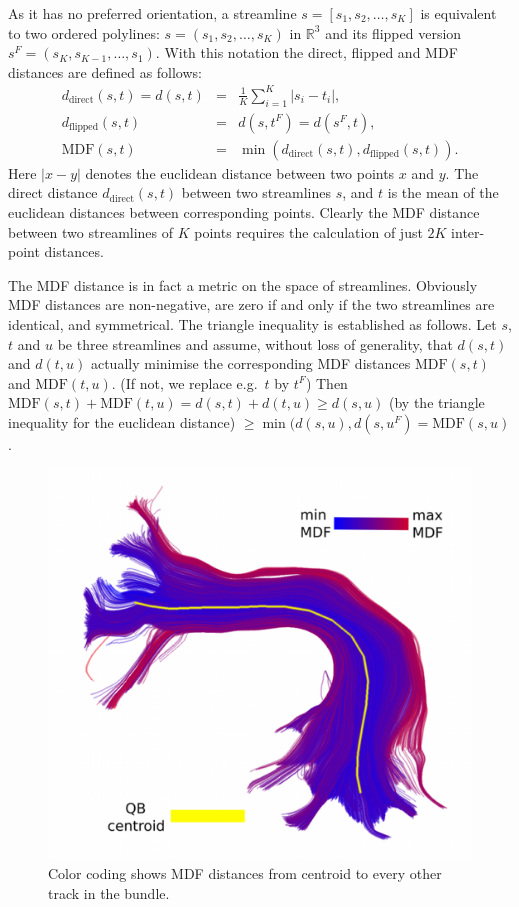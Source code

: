 \documentclass{bioinfo}
\begin{document}
\begin{methods}
As it has no preferred orientation, a streamline $s=[s_1, s_2, \ldots, s_K]$ is equivalent to
two ordered polylines: $s = (s_1, s_2, \ldots, s_K)$ in $\mathbb{R}^3$
and its flipped version $s^F = (s_K, s_{K-1}, \ldots, s_1)$.  With this
notation the direct, flipped and MDF distances are defined as follows:
\begin{eqnarray}
  d_{\textrm{direct}}(s, t) = d(s, t) & = & \frac{1}{K}\sum_{i=1}^{K}|s_{i}-t_{i}|,\nonumber\\
  d_{\textrm{flipped}}(s, t) & = & d(s,t^F) = d(s^F,t),\nonumber\\
  \textrm{MDF}(s, t) & = & \min(d_{\textrm{direct}}(s, t), d_{\textrm{flipped}}(s, t))\label{eq:direct_flip_distance}.
\end{eqnarray}
\noindent
Here $|x-y|$ denotes the euclidean distance between two points $x$ and
$y$. The direct distance $d_{\mathrm{direct}}(s, t)$ between two
streamlines $s$, and $t$ is the mean of the euclidean distances between
corresponding points. Clearly the MDF distance between two streamlines
of $K$ points requires the calculation of just $2K$ inter-point
distances.

The MDF distance is in fact a metric on the space of streamlines.
Obviously MDF distances are non-negative, are zero if and only if the
two streamlines are identical, and symmetrical.  The triangle inequality
is established as follows. Let $s$, $t$ and $u$ be three streamlines
and assume, without loss of generality, that $d(s,t)$ and $d(t,u)$ actually
minimise the corresponding MDF distances $\mathrm{MDF}(s,t)$ and
$\mathrm{MDF}(t,u)$. (If not, we replace e.g.~$t$ by $t^F$) Then
$\mathrm{MDF}(s, t) + \mathrm{MDF}(t, u) = d(s, t) + d(t, u) \ge d(s,
u)$ (by the triangle inequality for the euclidean distance) $ \ge
\min(d(s,u), d(s, u^F) = \mathrm{MDF}(s, u)$.

\begin{figure}
\includegraphics[scale=0.15]{Figures/Fig_11_MDF_arcuate}
\centering{}
\caption{Color coding shows MDF distances from centroid to every other track in the bundle.\label{Flo:MDF_arcuate}}
\end{figure}


\end{methods}
\end{document}
